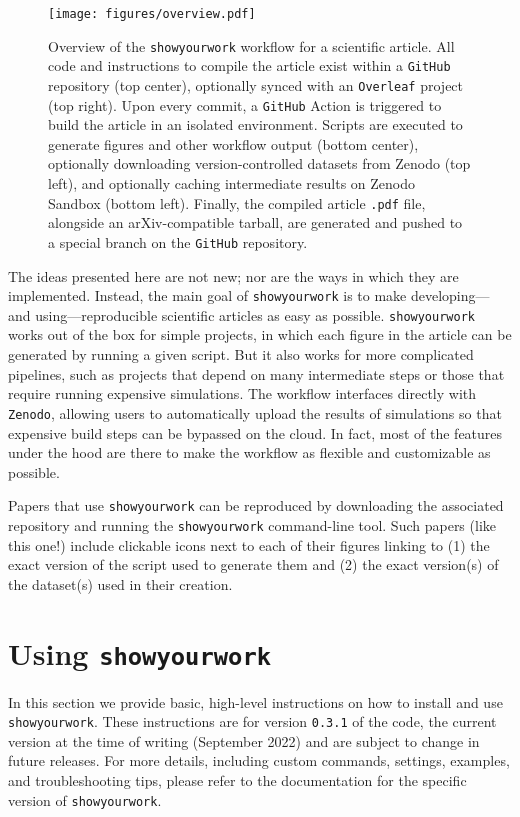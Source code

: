 \documentclass[modern]{aastex631}
\newcommand\VERSION{0.3.1}
\newcommand\MONTHYEAR{September 2022}
\newcommand\syw{\texttt{showyourwork}\xspace}
\begin{document}
\begin{figure}[t!]
    \begin{centering}
        \texttt{[image: figures/overview.pdf]}
        \caption{
            Overview of the \syw workflow for a scientific article.
            All code and instructions to compile the article exist within a \texttt{GitHub} repository (top center), optionally synced with an \texttt{Overleaf} project (top right).
            Upon every commit, a \texttt{GitHub} Action is triggered to build the article in an isolated environment.
            Scripts are executed to generate figures and other workflow output (bottom center), optionally downloading version-controlled datasets from Zenodo (top left), and optionally caching intermediate results on Zenodo Sandbox (bottom left).
            Finally, the compiled article \texttt{.pdf} file, alongside an arXiv-compatible tarball, are generated and pushed to a special branch on the \texttt{GitHub} repository.
        }
        \label{fig:overview}
    \end{centering}
\end{figure}

The ideas presented here are not new; nor are the ways in which they are implemented.
Instead, the main goal of \syw is to make developing---and using---reproducible scientific articles as easy as possible.
\syw works out of the box for simple projects, in which each figure in the article can be generated by running a given script. 
But it also works for more complicated pipelines, such as projects that depend on many intermediate steps or those that require running expensive simulations. 
The workflow interfaces directly with \texttt{Zenodo}, allowing users to automatically upload the results of simulations so that expensive build steps can be bypassed on the cloud. 
In fact, most of the features under the hood are there to make the workflow as flexible and customizable as possible.

Papers that use \syw can be reproduced by downloading the associated repository and running the \syw command-line tool. 
Such papers (like this one!) include clickable icons next to each of their figures linking to (1) the exact version of the script used to generate them and (2) the exact version(s) of the dataset(s) used in their creation.

\section{Using {\protect\syw}}
\label{sec:usage}
In this section we provide basic, high-level instructions on how to install and use \syw.
These instructions are for version \texttt{\VERSION} of the code, the current version at the time of writing (\MONTHYEAR) and are subject to change in future releases.
For more details, including custom commands, settings, examples, and troubleshooting tips, please refer to the documentation for the specific version of \syw.
\end{document}
